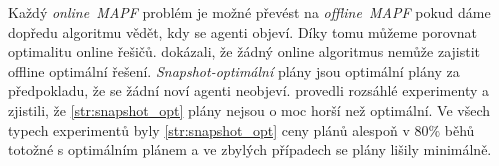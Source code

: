 Každý \emph{online~MAPF} problém je možné převést na \emph{offline~MAPF} pokud dáme dopředu algoritmu vědět, kdy se agenti objeví.
Díky tomu můžeme porovnat optimalitu online řešičů.
\citet{Svancara} dokázali, že žádný online algoritmus nemůže zajistit offline optimální řešení.
\emph{Snapshot-optimální} plány jsou optimální plány za předpokladu, že se žádní noví agenti neobjeví.
\citet*{Morag} provedli rozsáhlé experimenty a zjistili, že \ref{str:snapshot_opt} plány nejsou o moc horší než optimální.
Ve všech typech experimentů \citet{Morag} byly \ref{str:snapshot_opt} ceny plánů alespoň v $80\%$ běhů totožné s optimálním plánem
a ve zbylých případech se plány lišily minimálně.


%
%
